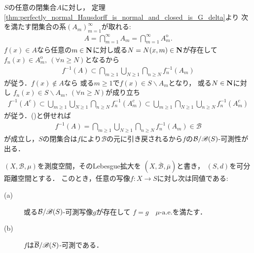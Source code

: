 		\begin{prf}
			$S$の任意の閉集合$A$に対し，
			定理\ref{thm:perfectly_normal_Hausdorff_is_normal_and_closed_is_G_delta}より
			次を満たす閉集合の系$(A_m)_{m=1}^{\infty}$が取れる:
			\begin{align}
				A = \bigcap_{m=1}^\infty A_m 
				= \bigcap_{m=1}^\infty A_m^{\mathrm{o}}.
			\end{align}
			$f(x) \in A$なら任意の$m \in \mathbf{N}$に対し或る$N = N(x,m) \in \mathbf{N}$が存在して
			$f_n(x) \in A_m^{\mathrm{o}},\ (\forall n \geq N)$となるから
			\begin{align}
				f^{-1}(A) \subset \bigcap_{m \geq 1} \bigcup_{N \geq 1} \bigcap_{n \geq N} f_n^{-1}(A_m)
				\label{eq:lem_measurability_metric_space}
			\end{align}
			が従う．$f(x) \notin A$なら
			或る$m \geq 1$で$f(x) \in S \backslash A_m$となり，
			或る$N \in \mathbf{N}$に対し
			$f_n(x) \in S \backslash A_m,\ (\forall n \geq N)$が成り立ち
			\begin{align}
				f^{-1}(A^c) \subset \bigcup_{m \geq 1} \bigcup_{N \geq 1} \bigcap_{n \geq N} f_n^{-1}(A_m^c)
				\subset \bigcup_{m \geq 1} \bigcap_{N \geq 1} \bigcup_{n \geq N} f_n^{-1}(A_m^c)
			\end{align}
			が従う．()と併せれば
			\begin{align}
				f^{-1}(A) = \bigcap_{m \geq 1} \bigcup_{N \geq 1} \bigcap_{n \geq N} f_n^{-1}(A_m)
				\in \mathcal{B}
			\end{align}
			が成立し，$S$の閉集合は$f$により$\mathcal{B}$の元に引き戻されるから$f$の$\mathcal{B}/\mathscr{B}(S)$-可測性が出る．
			\QED
		\end{prf}
		
		\begin{screen}
			\begin{thm}[拡大前後の可測性]\label{thm:measurability_before_after_Lebesgue_extension}
				$(X,\mathcal{B},\mu)$を測度空間，そのLebesgue拡大を
				$\left(X,\overline{\mathcal{B}},\overline{\mu}\right)$と書き，
				$(S,d)$を可分距離空間とする．
				このとき，任意の写像$f:X \longrightarrow S$に対し次は同値である:
				\begin{description}
					\item[(a)] 或る$\mathcal{B}/\mathscr{B}(S)$-可測写像$g$が存在して
						$f = g\quad \mbox{$\mu$-a.e.}$を満たす．
					\item[(b)] $f$は$\overline{\mathcal{B}}/\mathscr{B}(S)$-可測である．
				\end{description}
			\end{thm}
		\end{screen}
		
